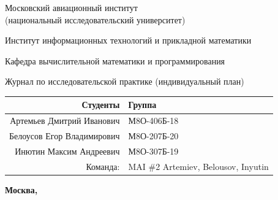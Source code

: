 \documentclass[12pt]{article}
\begin{document}
\begin{titlepage}
\begin{center}
\bfseries

{\Large Московский авиационный институт\\ (национальный исследовательский университет)}

\vspace{36pt}

\large Институт информационных технологий и прикладной математики


\vspace{36pt}

\large Кафедра вычислительной математики и программирования

\vspace{48pt}

Журнал по исследовательской практике (индивидуальный план)

\end{center}

\vspace{120pt}

\begin{flushleft}
\begin{tabular}{|r|l|}
\hline
Студенты & Группа \\
\hline
Артемьев Дмитрий Иванович & М8О-406Б-18 \\
\hline
Белоусов Егор Владимирович & М8О-207Б-20 \\
\hline
Инютин Максим Андреевич & М8О-307Б-19 \\
\hline
Команда: & MAI \#2 Artemiev, Belousov, Inyutin \\
\hline
\end{tabular}
\end{flushleft}

\vspace*{\fill}

\begin{center}
\bfseries
Москва, \the\year
\end{center}
\end{titlepage}

\pagebreak
\end{document}

